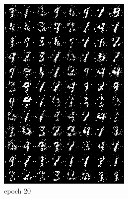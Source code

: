 \documentclass[a4paper]{article}
\theoremstyle{definition}
\begin{document}
\begin{enumerate} [label=(\alph*)]
\begin{figure}[H]
\begin{subfigure}[b]{0.28\textwidth}
				\includegraphics[width=\textwidth]{gen_img20.png}
				\caption{epoch 20}
			\end{subfigure}
			\hfill
			\begin{subfigure}[b]{0.28\textwidth}
				\centering

\end{subfigure}
\end{figure}
\end{enumerate}
\end{document}
